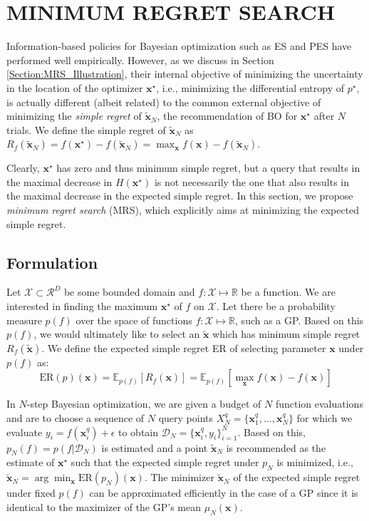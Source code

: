 \documentclass[10pt,letterpaper]{article} %
\begin{document}
\section{MINIMUM REGRET SEARCH} \label{Section:MRS}

Information-based policies for Bayesian optimization such as ES and PES
have performed well empirically. However, as we discuss in Section \ref{Section:MRS_Illustration},
their internal objective of minimizing
the uncertainty in the location of the optimizer $\mathbf{x}^\star$, i.e.,
minimizing the differential entropy of $p^\star$, is actually different (albeit
related) to the common external objective of minimizing the \emph{simple regret} of
$\mathbf{\tilde x}_N$, the recommendation of BO for $\mathbf{x}^\star$ after $N$
trials. We define the simple regret of $\mathbf{\tilde x}_N$ as
$R_f(\mathbf{\tilde  x}_N) = f(\mathbf{x}^\star) - f(\mathbf{\tilde  x}_N) = \max_{\mathbf{x}} f(\mathbf{x}) - f(\mathbf{\tilde x}_N)$.

Clearly, $\mathbf{x}^\star$ has zero and thus minimum simple regret, but a query that
results in the maximal decrease in $H(\mathbf{x}^\star)$ is not necessarily the
one that also results in the maximal decrease in the expected simple regret. 
In this section, we propose \emph{minimum regret search} (MRS), 
which explicitly aims at minimizing the expected simple
regret.

\subsection{Formulation}
Let $\mathcal{X} \subset \mathcal{R}^D$ be some bounded domain and $f: \mathcal{X} \mapsto
\mathbb{R}$ be a function. We are interested in finding the maximum
$\mathbf{x}^\star$ of $f$ on $\mathcal{X}$. Let there be a probability measure
$p(f)$ over the space of functions $f: \mathcal{X} \mapsto \mathbb{R}$, such as
a GP. Based on this $p(f)$, we would ultimately like to
select an $\mathbf{\tilde x}$ which has minimum simple regret
$R_f(\mathbf{\tilde x})$. We define the expected simple regret ER of
selecting parameter $\mathbf{x}$ under $p(f)$ as:
$$\text{ER}(p)(\mathbf{x}) = \mathbb{E}_{p(f)}[R_f(\mathbf{x})]
= \mathbb{E}_{p(f)}[\max_{\mathbf{x}} f(\mathbf{x}) - f(\mathbf{
x})]$$

In $N$-step Bayesian optimization, we are given a budget of $N$ function evaluations and are to choose a sequence of $N$ query points
$X^q_N=\{\mathbf{x}^q_1, \dots, \mathbf{x}^q_N\}$ for which we evaluate $y_i = f(\mathbf{x}^q_i) +
\epsilon$ to obtain $\mathcal{D}_N = \{\mathbf{x}^q_i, y_i\}_{i=1}^N$. Based on this, 
 $p_N(f) = p(f \vert \mathcal{D}_N)$ is estimated and a point
$\mathbf{\tilde x}_N$ is recommended as the estimate of $\mathbf{x}^\star$ such that the
expected simple regret under $p_N$ is minimized, i.e., $\mathbf{\tilde x}_N = \arg\min_\mathbf{x}
\text{ER}(p_N)(\mathbf{x})$.
The minimizer $\mathbf{\tilde x}_N$ of the expected simple regret under fixed
$p(f)$ can be approximated efficiently in the case of a GP since it is
identical to the maximizer of the GP's mean $\mu_N(\mathbf{x})$. 
\end{document}
